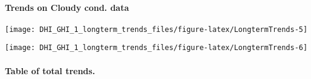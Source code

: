 \documentclass[
  10pt,
  a4paper,oneside]{article}
\begin{document}
\newpage

\hypertarget{trends-on-cloudy-cond.-data}{%
\paragraph{Trends on Cloudy cond. data}\label{trends-on-cloudy-cond.-data}}

\begin{center}\texttt{[image: DHI\_GHI\_1\_longterm\_trends\_files/figure-latex/LongtermTrends-5]} \end{center}

\begin{center}\texttt{[image: DHI\_GHI\_1\_longterm\_trends\_files/figure-latex/LongtermTrends-6]} \end{center}

\newpage

\hypertarget{table-of-total-trends.}{%
\paragraph{Table of total trends.}\label{table-of-total-trends.}}

\scriptsize
\end{document}
